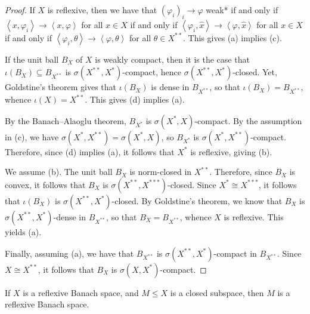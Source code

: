 \documentclass[10pt]{mypackage}
\begin{document}
\begin{proof}
  If $X$ is reflexive, then we have that $\left( \varphi_i \right)_i\rightarrow \varphi$ weak* if and only if $\left\langle x,\varphi_i \right\rangle\rightarrow \left\langle x,\varphi \right\rangle$ for all $x\in X$ if and only if $ \left\langle \varphi_i,\hat{x} \right\rangle \rightarrow \left\langle \varphi,\hat{x} \right\rangle $ for all $x\in X$ if and only if $ \left\langle \varphi_i, \theta \right\rangle\rightarrow \left\langle \varphi,\theta \right\rangle $ for all $\theta\in X^{\ast\ast}$. This gives (a) implies (c).

  If the unit ball $B_X$ of $X$ is weakly compact, then it is the case that $\iota\left( B_X \right)\subseteq B_{X^{\ast\ast}}$ is $\sigma\left( X^{\ast\ast},X^{\ast} \right)$-compact, hence $\sigma\left( X^{\ast\ast},X^{\ast} \right)$-closed. Yet, Goldstine's theorem gives that $\iota\left( B_X \right)$ is dense in $B_{X^{\ast\ast}}$, so that $\iota\left( B_X \right) = B_{X^{\ast\ast}}$, whence $\iota\left( X \right) = X^{\ast\ast}$. This gives (d) implies (a).

  By the Banach--Alaoglu theorem, $B_{X^{\ast}}$ is $\sigma\left( X^{\ast},X \right)$-compact. By the assumption in (c), we have $\sigma\left( X^{\ast},X^{\ast\ast} \right) = \sigma\left( X^{\ast},X \right)$, so $B_{X^{\ast}}$ is $\sigma\left( X^{\ast},X^{\ast\ast} \right)$-compact. Therefore, since (d) implies (a), it follows that $X^{\ast}$ is reflexive, giving (b).

  We assume (b). The unit ball $B_X$ is norm-closed in $X^{\ast\ast}$. Therefore, since $B_X$ is convex, it follows that $B_X$ is $\sigma\left( X^{\ast\ast},X^{\ast\ast\ast} \right)$-closed. Since $X^{\ast}\cong X^{\ast\ast\ast}$, it follows that $\iota\left( B_X \right)$ is $\sigma\left( X^{\ast\ast},X^{\ast} \right)$-closed. By Goldstine's theorem, we know that $B_X$ is $\sigma\left( X^{\ast\ast},X^{\ast} \right)$-dense in $B_{X^{\ast\ast}}$, so that $B_X = B_{X^{\ast\ast}}$, whence $X$ is reflexive. This yields (a).

  Finally, assuming (a), we have that $B_{X^{\ast\ast}}$ is $\sigma\left( X^{\ast\ast},X^{\ast} \right)$-compact in $B_{X^{\ast\ast}}$. Since $X \cong X^{\ast\ast}$, it follows that $B_X$ is $\sigma\left( X,X^{\ast} \right)$-compact.
\end{proof}
\begin{corollary}
  If $X$ is a reflexive Banach space, and $M\leq X$ is a closed subspace, then $M$ is a reflexive Banach space.
\end{corollary}
\end{document}
